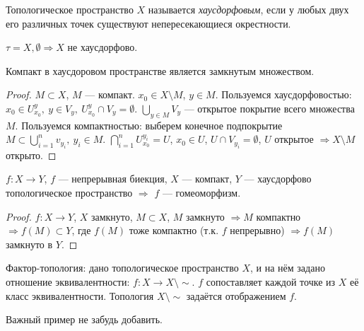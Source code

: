 \begin{definition}
    Топологическое пространство $X$ называется \textit{хаусдорфовым}, если у любых двух его различных точек существуют непересекающиеся окрестности.
\end{definition}

$\tau = {X, \emptyset} \Rightarrow X$ не хаусдорфово.

\begin{lemma}
    Компакт в хаусдоровом пространстве является замкнутым множеством.
\end{lemma}
\begin{proof}
    $M \subset X$, $M$ — компакт.
    $x_0 \in X \setminus M$, $y \in M$.
    Пользуемся хаусдорфовостью: $x_0 \in U_{x_0}^y, \ y \in V_y, \ U_{x_0}^y \cap V_y = \emptyset$.
    $\bigcup_{y \in M} V_y$ — открытое покрытие всего множества $M$.
    Пользуемся компактностью: выберем конечное подпокрытие $M \subset \bigcup_{i = 1}^n v_{y_i}, \ y_i \in M$.
    $\bigcap_{i = 1}^n U_{x_0}^{y_i} = U$, $x_0 \in U$, $U \cap V_{y_i} = \emptyset$, $U$ открытое $\Rightarrow X \setminus M$ открыто.
\end{proof}

\begin{statement}
    $f: X \to Y$, $f$ — непрерывная биекция, $X$ — компакт, $Y$ — хаусдорфово топологическое пространство $\Longrightarrow$ $f$ — гомеоморфизм.
\end{statement}
\begin{proof}
    $f: X \to Y$, $X$ замкнуто, $M \subset X$, $M$ замкнуто $\Rightarrow M$ компактно $\Rightarrow f(M) \subset Y$, где $f(M)$ тоже компактно (т.к. $f$ непрерывно) $\Rightarrow f(M)$ замкнуто в $Y$. 
\end{proof}

Фактор-топология: дано топологическое пространство $X$, и на нём задано отношение эквивалентности: $f: X \to X \setminus \sim$. $f$ сопоставляет каждой точке из $X$ её класс эквивалентности.
Топология $X \setminus \sim$ задаётся отображением $f$.

Важный пример не забудь добавить.

